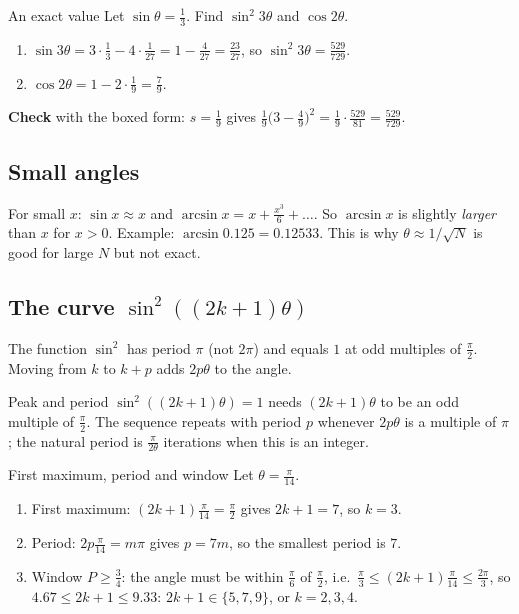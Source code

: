 \documentclass[11pt,a4paper,openany]{book}
\newcounter{wex}[section]
\newenvironment{steps}{\begin{enumerate}[label=\textbf{Step \arabic*.}, leftmargin=4.2em, itemsep=2pt]}{\end{enumerate}}
\begin{document}
\begin{wexample}{An exact value}
Let $\sin\theta = \frac13$. Find $\sin^2 3\theta$ and $\cos2\theta$.
\begin{steps}
\item $\sin3\theta = 3\cdot\frac13 - 4\cdot\frac{1}{27} = 1 - \frac{4}{27} = \frac{23}{27}$, so $\sin^2 3\theta = \frac{529}{729}$.
\item $\cos2\theta = 1 - 2\cdot\frac19 = \frac79$.
\end{steps}
\textbf{Check} with the boxed form: $s = \frac19$ gives $\frac19\big(3 - \frac49\big)^2 = \frac19\cdot\frac{529}{81} = \frac{529}{729}$. \checkmark
\end{wexample}

\subsection{Small angles}
For small $x$: $\sin x \approx x$ and $\arcsin x = x + \frac{x^3}{6} + \dots$. So $\arcsin x$ is slightly \emph{larger} than $x$ for $x > 0$.
Example: $\arcsin 0.125 = 0.12533$. This is why $\theta \approx 1/\sqrt N$ is good for large $N$ but not exact.

\subsection{The curve $\sin^2((2k+1)\theta)$}
The function $\sin^2$ has period $\pi$ (not $2\pi$) and equals $1$ at odd multiples of $\frac\pi2$. Moving from $k$ to $k + p$ adds $2p\theta$ to the angle.
\begin{keyres}{Peak and period}
$\sin^2((2k+1)\theta) = 1$ needs $(2k+1)\theta$ to be an odd multiple of $\frac\pi2$. The sequence repeats with period $p$ whenever $2p\theta$ is a multiple of $\pi$; the
natural period is $\frac{\pi}{2\theta}$ iterations when this is an integer.
\end{keyres}

\begin{wexample}{First maximum, period and window}
Let $\theta = \frac{\pi}{14}$.
\begin{steps}
\item First maximum: $(2k+1)\frac{\pi}{14} = \frac\pi2$ gives $2k + 1 = 7$, so $k = 3$.
\item Period: $2p\frac{\pi}{14} = m\pi$ gives $p = 7m$, so the smallest period is $7$.
\item Window $P \ge \frac34$: the angle must be within $\frac\pi6$ of $\frac\pi2$, i.e.\ $\frac{\pi}{3} \le (2k+1)\frac{\pi}{14} \le \frac{2\pi}{3}$, so $4.67 \le 2k + 1 \le 9.33$: $2k + 1 \in \{5, 7, 9\}$, or $k = 2, 3, 4$.
\end{steps}
\end{wexample}
\end{document}

